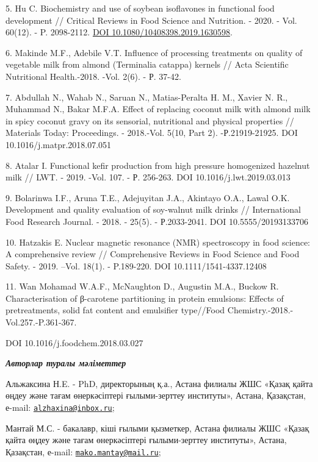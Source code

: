 {5. Hu C. Biochemistry and use of soybean isoflavones in functional food
development // Critical Reviews in Food Science and Nutrition. - 2020. -
Vol. 60(12). - P. 2098-2112.
\href{https://doi.org/10.1080/10408398.2019.1630598}{DOI
10.1080/10408398.2019.1630598}.

6. Makinde M.F., Adebile V.T. Influence of processing treatments on
quality of vegetable milk from almond (Terminalia catappa) kernels //
Acta Scientific Nutritional Health.-2018. -Vol. 2(6). - Р. 37-42.

7. Abdullah N., Wahab N., Saruan N., Matias-Peralta H. M., Xavier N. R.,
Muhammad N., Bakar M.F.A. Effect of replacing coconut milk with almond
milk in spicy coconut gravy on its sensorial, nutritional and physical
properties // Materials Today: Proceedings. - 2018.-Vol. 5(10, Part 2).
-Р.21919-21925. DOI 10.1016/j.matpr.2018.07.051

8. Atalar I. Functional kefir production from high pressure homogenized
hazelnut milk // LWT. - 2019. -Vol. 107. - Р. 256-263. DOI
10.1016/j.lwt.2019.03.013

9. Bolarinwa I.F., Aruna T.E., Adejuyitan J.A., Akintayo O.A., Lawal
O.K. Development and quality evaluation of soy-walnut milk drinks //
International Food Research Journal. - 2018. - 25(5). - Р.2033-2041. DOI
10.5555/20193133706

10. Hatzakis E. Nuclear magnetic resonance (NMR) spectroscopy in food
science: A comprehensive review // Comprehensive Reviews in Food Science
and Food Safety. - 2019. --Vol. 18(1). - P.189-220. DOI
10.1111/1541-4337.12408

11. Wan Mohamad W.A.F., McNaughton D., Augustin M.A., Buckow R.
Characterisation of β-carotene partitioning in protein emulsions:
Effects of pretreatments, solid fat content and emulsifier type//Food
Chemistry.-2018.-Vol.257.-P.361-367.

DOI 10.1016/j.foodchem.2018.03.027

\emph{{\bfseries Авторлар туралы мәліметтер}}

Альжаксина Н.E. - PhD, директорының қ.а., Астана филиалы ЖШС «Қазақ
қайта өңдеу және тағам өнеркәсіптері ғылыми-зерттеу институты», Астана,
Қазақстан, е-mail:
\href{mailto:alzhaxina@inbox.ru}{\nolinkurl{alzhaxina@inbox.ru}};

Мантай М.С. - бакалавр, кіші ғылыми қызметкер, Астана филиалы ЖШС «Қазақ
қайта өңдеу және тағам өнеркәсіптері ғылыми-зерттеу институты», Астана,
Қазақстан, е-mail:
\href{mailto:mako.mantay@mail.ru}{\nolinkurl{mako.mantay@mail.ru}};

}
